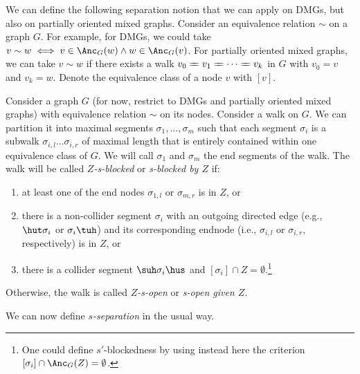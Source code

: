 We can define the following separation notion that we can apply on DMGs, but also on partially oriented mixed graphs.
Consider an equivalence relation $\sim$ on a graph $G$. 
For example, for DMGs, we could take $v \sim w \iff v \in \Anc_G(w) \land w \in \Anc_G(v)$. 
For partially oriented mixed graphs, we can take $v \sim w$ if there exists a walk $v_0 \otto v_1 \otto \dots \otto v_k$ in $G$ with $v_0 = v$ and $v_k = w$.
Denote the equivalence class of a node $v$ with $[v]$.
\begin{Def}
  Consider a graph $G$ (for now, restrict to DMGs and partially oriented mixed graphs) with equivalence relation $\sim$ on its nodes.
  Consider a walk on $G$. 
  We can partition it into maximal segments $\sigma_1, \dots, \sigma_m$ such that each segment $\sigma_i$ is a subwalk $\sigma_{i,l} \dots \sigma_{i,r}$ of maximal length that is entirely contained within one equivalence class of $G$.
  We will call $\sigma_1$ and $\sigma_m$ the end segments of the walk.
  The walk will be called \emph{$Z$-s-blocked} or \emph{s-blocked by $Z$} if:
  \begin{enumerate}
    \item at least one of the end nodes $\sigma_{1,l}$ or $\sigma_{m,r}$ is in $Z$, or
    \item there is a non-collider segment $\sigma_i$ with an outgoing directed edge (e.g., $\hut \sigma_i$ or $\sigma_i \tuh$) and its corresponding endnode (i.e., $\sigma_{i,l}$ or $\sigma_{i,r}$, respectively) is in $Z$, or
    \item there is a collider segment $\suh \sigma_i \hus$ and $[\sigma_i] \cap Z = \emptyset$.\footnote{One could define $s'$-blockedness by using instead here the criterion $[\sigma_i] \cap \Anc_G(Z) = \emptyset$.}
  \end{enumerate}
  Otherwise, the walk is called \emph{$Z$-s-open} or \emph{s-open given $Z$}.
\end{Def}
We can now define \emph{$s$-separation} in the usual way.

